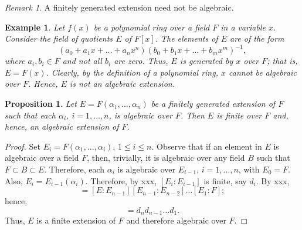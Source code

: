 \documentclass[draft]{article}
\newtheorem{prop}[thm]{Proposition}
\newtheorem{exmp}{Example}
\theoremstyle{definition}
\theoremstyle{remark}
\newtheorem{rem}{Remark}[section]
\begin{document}
            \begin{rem}
                A finitely generated extension need not be algebraic.
            \end{rem}
            
             \begin{exmp}
                Let $f(x)$ be a polynomial ring over a field $F$ in a variable $x$. Consider the field of quotients $E$ of $F[x]$. The elements of $E$ are of the form
                \begin{equation*}
                    (a_0 + a_1x + \dots + a_nx^n)(b_0 + b_1x + \dots + b_mx^m)^{-1},
                \end{equation*}
                where $a_i, b_i \in F$ and not all $b_i$ are zero. Thus, $E$ is generated by $x$ over $F$; that is, $E = F(x)$. Clearly, by the definition of a polynomial ring, $x$ cannot be algebraic over $F$. Hence, $E$ is not an algebraic extension.
            \end{exmp}
            
            \begin{prop}
                Let $E = F(\alpha_1, \dots, \alpha_n)$ be a finitely generated extension of $F$ such that each $\alpha_i$, $i = 1, \dots, n$, is algebraic over $F$. Then $E$ is finite over $F$ and, hence, an algebraic extension of $F$.
            \end{prop}
            
            \begin{proof}
                Set $E_i = F(\alpha_1, \dots, \alpha_i)$, $1 \leq i \leq n$. Observe that if an element in $E$ is algebraic over a field $F$, then, trivially, it is algebraic over any field $B$ such that $F \subset B \subset E$. Therefore, each $\alpha_i$ is algebraic over $E_{i - 1}$, $i = 1, \dots, n$, with $E_0 = F$. Also, $E_i = E_{i - 1}(\alpha_i)$. Therefore, by xxx, $[E_i : E_{i - 1}]$ is finite, say $d_i$. By xxx,
                \begin{equation*}
                    [E:F] = [E:E_{n - 1}][E_{n - 1}:E_{n - 2}] \dots [E_1:F];
                \end{equation*}
                hence,
                \begin{equation*}
                    [E:F] = d_nd_{n - 1} \dots d_1.
                \end{equation*}
                Thus, $E$ is a finite extension of $F$ and therefore algebraic over $F$.
            \end{proof}
            
\end{document}
